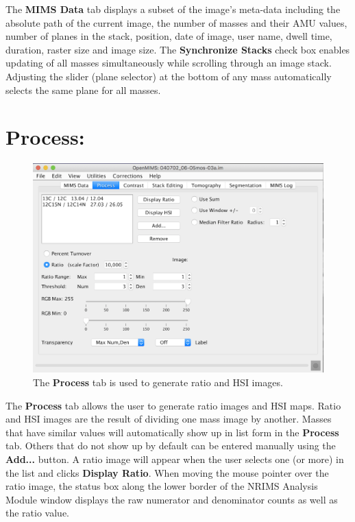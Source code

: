 \documentclass{article}
\begin{document}
	The \textbf{MIMS Data} tab displays a subset of the image's meta-data
	including the absolute path of the current image, the number of masses 
	and their AMU values, number of planes in the stack, position, date 
	of image, user name, dwell time, duration, raster size and image size. 
	The \textbf{Synchronize Stacks} check box enables updating of all masses 
	simultaneously while scrolling through an image stack. Adjusting the 
	slider (plane selector) at the bottom of any mass automatically selects 
	the same plane for all masses.


\newpage
\section*{Process:}
	
	\begin{figure}[ht]
	\centering
	\includegraphics[scale=0.65]{snapshotProcess.png}
	\caption{The \textbf{Process} tab is used to generate ratio and HSI images.}
	\end{figure}

	The \textbf{Process} tab allows the user to generate ratio images and HSI maps. 
	Ratio and HSI images are the result of dividing one mass image by another. Masses that have 
	similar values will automatically show up in list form in the \textbf{Process} tab.
	Others that do not show up by default can be 
	entered manually using the \textbf{Add...} button.
	A ratio image will appear when the user selects one (or more) in the list and 
	clicks \textbf{Display Ratio}. When moving the mouse pointer 
	over the ratio image, the 
	status box along the lower border of the NRIMS Analysis Module window displays 
	the raw numerator and denominator counts as well as the ratio value.
\end{document}
